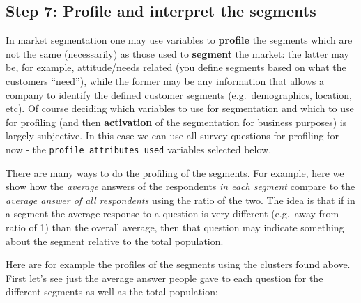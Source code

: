 \documentclass[
]{article}
\begin{document}
\hypertarget{step-7-profile-and-interpret-the-segments}{%
\subsection{Step 7: Profile and interpret the
segments}\label{step-7-profile-and-interpret-the-segments}}

In market segmentation one may use variables to \textbf{profile} the
segments which are not the same (necessarily) as those used to
\textbf{segment} the market: the latter may be, for example,
attitude/needs related (you define segments based on what the customers
``need''), while the former may be any information that allows a company
to identify the defined customer segments (e.g.~demographics, location,
etc). Of course deciding which variables to use for segmentation and
which to use for profiling (and then \textbf{activation} of the
segmentation for business purposes) is largely subjective. In this case
we can use all survey questions for profiling for now - the
\texttt{profile\_attributes\_used} variables selected below.

There are many ways to do the profiling of the segments. For example,
here we show how the \emph{average} answers of the respondents \emph{in
each segment} compare to the \emph{average answer of all respondents}
using the ratio of the two. The idea is that if in a segment the average
response to a question is very different (e.g.~away from ratio of 1)
than the overall average, then that question may indicate something
about the segment relative to the total population.

Here are for example the profiles of the segments using the clusters
found above. First let's see just the average answer people gave to each
question for the different segments as well as the total population:
\end{document}
